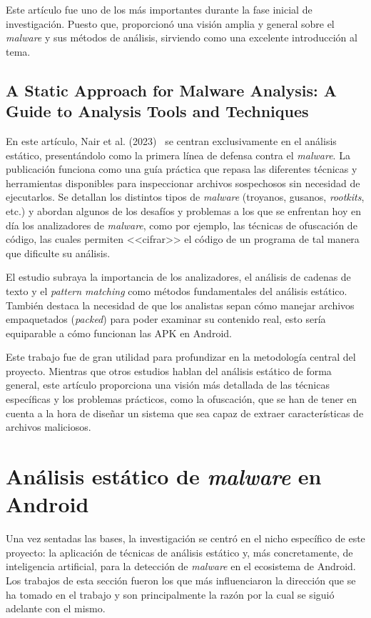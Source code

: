 Este artículo fue uno de los más importantes durante la fase inicial de investigación. Puesto que, proporcionó una visión amplia y general sobre el \textit{malware} y sus métodos de análisis, sirviendo como una excelente introducción al tema.

\subsection{A Static Approach for Malware Analysis: A Guide to Analysis Tools and Techniques}

En este artículo, Nair et al. (2023)~\cite{nair2023static} se centran exclusivamente en el análisis estático, presentándolo como la primera línea de defensa contra el \textit{malware}. La publicación funciona como una guía práctica que repasa las diferentes técnicas y herramientas disponibles para inspeccionar archivos sospechosos sin necesidad de ejecutarlos. Se detallan los distintos tipos de \textit{malware} (troyanos, gusanos, \textit{rootkits}, etc.) y abordan algunos de los desafíos y problemas a los que se enfrentan hoy en día los analizadores de \textit{malware}, como por ejemplo, las técnicas de ofuscación de código, las cuales permiten <<cifrar>> el código de un programa de tal manera que dificulte su análisis.

El estudio subraya la importancia de los analizadores, el análisis de cadenas de texto y el \textit{pattern matching} como métodos fundamentales del análisis estático. También destaca la necesidad de que los analistas sepan cómo manejar archivos empaquetados (\textit{packed}) para poder examinar su contenido real, esto sería equiparable a cómo funcionan las APK en Android.

Este trabajo fue de gran utilidad para profundizar en la metodología central del proyecto. Mientras que otros estudios hablan del análisis estático de forma general, este artículo proporciona una visión más detallada de las técnicas específicas y los problemas prácticos, como la ofuscación, que se han de tener en cuenta a la hora de diseñar un sistema que sea capaz de extraer características de archivos maliciosos.

\section{Análisis estático de \textit{malware} en Android}

Una vez sentadas las bases, la investigación se centró en el nicho específico de este proyecto: la aplicación de técnicas de análisis estático y, más concretamente, de inteligencia artificial, para la detección de \textit{malware} en el ecosistema de Android. Los trabajos de esta sección fueron los que más influenciaron la dirección que se ha tomado en el trabajo y son principalmente la razón por la cual se siguió adelante con el mismo.

